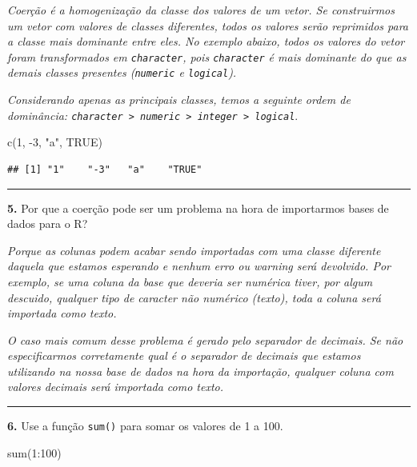 \documentclass[
]{book}
\newenvironment{Shaded}{\begin{snugshade}}{\end{snugshade}}
\newcommand{\ConstantTok}[1]{\textcolor[rgb]{0.00,0.00,0.00}{#1}}
\newcommand{\DecValTok}[1]{\textcolor[rgb]{0.00,0.00,0.81}{#1}}
\newcommand{\FunctionTok}[1]{\textcolor[rgb]{0.00,0.00,0.00}{#1}}
\newcommand{\NormalTok}[1]{#1}
\newcommand{\SpecialCharTok}[1]{\textcolor[rgb]{0.00,0.00,0.00}{#1}}
\newcommand{\StringTok}[1]{\textcolor[rgb]{0.31,0.60,0.02}{#1}}
\begin{document}
\emph{Coerção é a homogenização da classe dos valores de um vetor. Se construirmos um vetor com valores de classes diferentes, todos os valores serão reprimidos para a classe mais dominante entre eles. No exemplo abaixo, todos os valores do vetor foram transformados em \texttt{character}, pois \texttt{character} é mais dominante do que as demais classes presentes (\texttt{numeric} e \texttt{logical}).}

\emph{Considerando apenas as principais classes, temos a seguinte ordem de dominância: \texttt{character\ \textgreater{}\ numeric\ \textgreater{}\ integer\ \textgreater{}\ logical}}.

\begin{Shaded}
\begin{Highlighting}[]
\FunctionTok{c}\NormalTok{(}\DecValTok{1}\NormalTok{, }\SpecialCharTok{{-}}\DecValTok{3}\NormalTok{, }\StringTok{"a"}\NormalTok{, }\ConstantTok{TRUE}\NormalTok{)}
\end{Highlighting}
\end{Shaded}

\begin{verbatim}
## [1] "1"    "-3"   "a"    "TRUE"
\end{verbatim}

\begin{center}\rule{0.5\linewidth}{0.5pt}\end{center}

\textbf{5.} Por que a coerção pode ser um problema na hora de importarmos bases de dados para o R?

\emph{Porque as colunas podem acabar sendo importadas com uma classe diferente daquela que estamos esperando e nenhum erro ou warning será devolvido. Por exemplo, se uma coluna da base que deveria ser numérica tiver, por algum descuido, qualquer tipo de caracter não numérico (texto), toda a coluna será importada como texto.}

\emph{O caso mais comum desse problema é gerado pelo separador de decimais. Se não especificarmos corretamente qual é o separador de decimais que estamos utilizando na nossa base de dados na hora da importação, qualquer coluna com valores decimais será importada como texto.}

\begin{center}\rule{0.5\linewidth}{0.5pt}\end{center}

\textbf{6.} Use a função \texttt{sum()} para somar os valores de 1 a 100.

\begin{Shaded}
\begin{Highlighting}[]
\FunctionTok{sum}\NormalTok{(}\DecValTok{1}\SpecialCharTok{:}\DecValTok{100}\NormalTok{)}
\end{Highlighting}
\end{Shaded}
\end{document}
